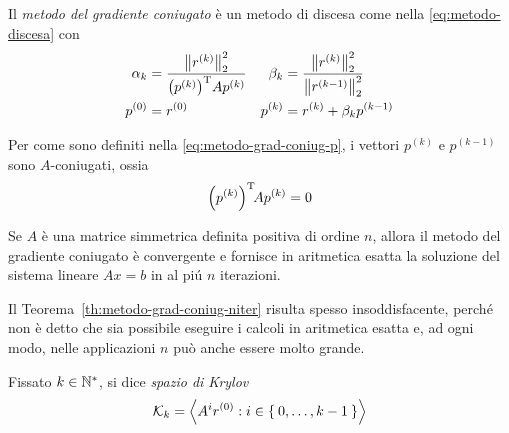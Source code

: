 	\begin{definizione}
		Il \emph{metodo del gradiente coniugato} è un metodo di discesa come nella \eqref{eq:metodo-discesa} con
		\begin{subequations}
		\begin{align}
			\alpha_k &= \frac{\bigl\| r^{(k)} \bigr\|_2^2}{\qty(p^{(k)})^\mathrm{T}\relax A p^{(k)}} &
			\beta_k &= \frac{\bigl\| r^{(k)} \bigr\|_2^2}{\bigl\| r^{(k - 1)} \bigr\|_2^2} \label{eq:metodo-grad-coniug-a-b} \\
			p^{(0)} &= r^{(0)} &
			p^{(k)} &= r^{(k)} + \beta_k p^{(k - 1)} \label{eq:metodo-grad-coniug-p}
		\end{align}
		\end{subequations}
	\end{definizione}

	Per come sono definiti nella \eqref{eq:metodo-grad-coniug-p}, i vettori \(p^{(k)}\) e \(p^{(k - 1)}\) sono \(A\)-coniugati, ossia
	\begin{equation}
		\qty(p^{(k)})^\mathrm{T}\relax \! A p^{(k)} = 0
	\end{equation}

	\begin{teorema}\label{th:metodo-grad-coniug-niter}
		Se \(A\) è una matrice simmetrica definita positiva di ordine \(n\), allora il metodo del gradiente coniugato è convergente e fornisce in aritmetica esatta la soluzione del sistema lineare \(A x = b\) in al piú \(n\) iterazioni.
	\end{teorema}

	Il Teorema~\ref{th:metodo-grad-coniug-niter} risulta spesso insoddisfacente, perché non è detto che sia possibile eseguire i calcoli in aritmetica esatta e, ad ogni modo, nelle applicazioni \(n\) può anche essere molto grande.
	
	\begin{definizione}
		Fissato \(k \in \mathbb{N}^*\), si dice \emph{spazio di Krylov}
		\begin{equation}\label{eq:spazio-krylov}
			\mathcal{K}_k = \Braket{A^i r^{(0)} : i \in \Set{0, \dots, k - 1}}
		\end{equation}
	\end{definizione}

